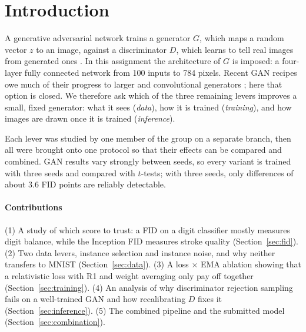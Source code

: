 \section{Introduction}
A generative adversarial network trains a generator $G$, which maps a random vector $z$ to an image, against a discriminator $D$, which learns to tell real images from generated ones \cite{goodfellow2014}. In this assignment the architecture of $G$ is imposed: a four-layer fully connected network from 100 inputs to 784 pixels. Recent GAN recipes owe much of their progress to larger and convolutional generators \cite{huang2024}; here that option is closed. We therefore ask which of the three remaining levers improves a small, fixed generator: what it sees (\emph{data}), how it is trained (\emph{training}), and how images are drawn once it is trained (\emph{inference}).

Each lever was studied by one member of the group on a separate branch, then all were brought onto one protocol so that their effects can be compared and combined. GAN results vary strongly between seeds, so every variant is trained with three seeds and compared with $t$-tests; with three seeds, only differences of about 3.6 FID points are reliably detectable.

\paragraph{Contributions}
(1) A study of which score to trust: a FID on a digit classifier mostly measures digit balance, while the Inception FID measures stroke quality (Section~\ref{sec:fid}).
(2) Two data levers, instance selection and instance noise, and why neither transfers to MNIST (Section~\ref{sec:data}).
(3) A loss $\times$ EMA ablation showing that a relativistic loss with R1 and weight averaging only pay off together (Section~\ref{sec:training}).
(4) An analysis of why discriminator rejection sampling fails on a well-trained GAN and how recalibrating $D$ fixes it (Section~\ref{sec:inference}).
(5) The combined pipeline and the submitted model (Section~\ref{sec:combination}).
